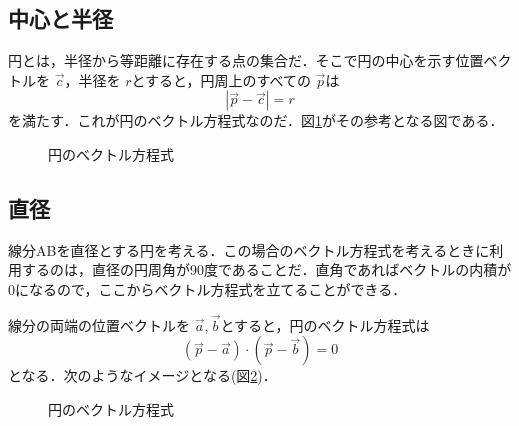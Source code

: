 \documentclass[dvipdfmx]{jsarticle}
\begin{document}
    \subsection{中心と半径}
    円とは，半径から等距離に存在する点の集合だ．そこで円の中心を示す位置ベクトルを \(\vec{c}\)，半径を \(r\)とすると，円周上のすべての \(\vec{p}\)は
    \begin{equation}
        |\vec{p}-\vec{c}|=r
        \label{eq_vector_equation_circle1}
    \end{equation}
    を満たす．これが円のベクトル方程式なのだ．図\ref{tikz_vector_equation_circle1}がその参考となる図である．

    \begin{figure}[htbp]\centering
        \caption{円のベクトル方程式}
        \label{tikz_vector_equation_circle1}
    \end{figure}

    \subsection{直径}
    線分ABを直径とする円を考える．この場合のベクトル方程式を考えるときに利用するのは，直径の円周角が90度であることだ．直角であればベクトルの内積が0になるので，ここからベクトル方程式を立てることができる．

    線分の両端の位置ベクトルを \(\vec{a},\vec{b}\)とすると，円のベクトル方程式は
    \begin{equation}
        (\vec{p}-\vec{a})\cdot(\vec{p}-\vec{b})=0
        \label{eq_vector_equation_circle2}
    \end{equation}
    となる．次のようなイメージとなる(図\ref{tikz_vector_equation_circle2})．

    \begin{figure}[htbp]\centering
        \caption{円のベクトル方程式}
        \label{tikz_vector_equation_circle2}
    \end{figure}
\end{document}
